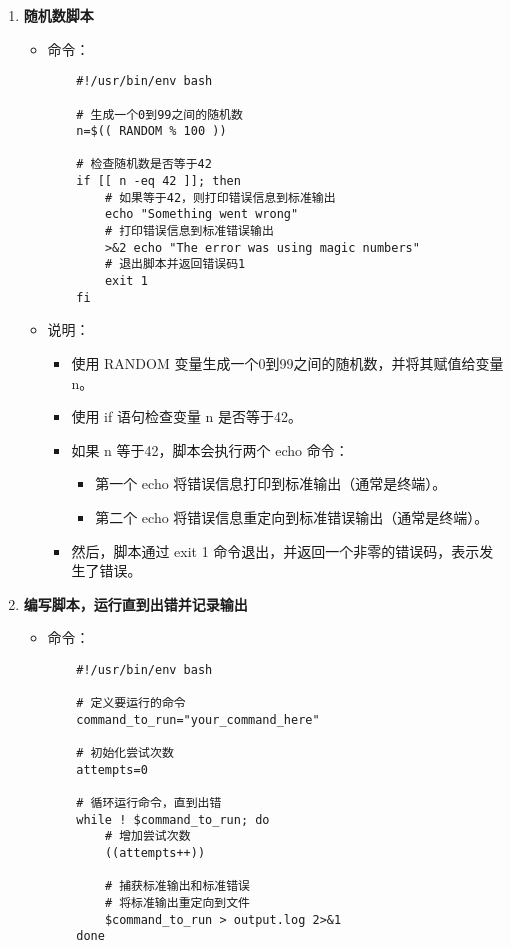 \documentclass[UTF8]{ctexart}
\begin{document}
\begin{enumerate}
\item \textbf{随机数脚本}
  \begin{itemize}
    \item 命令：
    \begin{verbatim}
    #!/usr/bin/env bash

    # 生成一个0到99之间的随机数
    n=$(( RANDOM % 100 ))

    # 检查随机数是否等于42
    if [[ n -eq 42 ]]; then
        # 如果等于42，则打印错误信息到标准输出
        echo "Something went wrong"
        # 打印错误信息到标准错误输出
        >&2 echo "The error was using magic numbers"
        # 退出脚本并返回错误码1
        exit 1
    fi
    \end{verbatim}
    \item 说明：
    \begin{itemize}
      \item 使用 RANDOM 变量生成一个0到99之间的随机数，并将其赋值给变量 n。
      \item 使用 if 语句检查变量 n 是否等于42。
      \item 如果 n 等于42，脚本会执行两个 echo 命令：
      \begin{itemize}
        \item 第一个 echo 将错误信息打印到标准输出（通常是终端）。
        \item 第二个 echo 将错误信息重定向到标准错误输出（通常是终端）。
      \end{itemize}
      \item 然后，脚本通过 exit 1 命令退出，并返回一个非零的错误码，表示发生了错误。
    \end{itemize}
  \end{itemize}

  \item \textbf{编写脚本，运行直到出错并记录输出}
  \begin{itemize}
    \item 命令：
    \begin{verbatim}
    #!/usr/bin/env bash

    # 定义要运行的命令
    command_to_run="your_command_here"

    # 初始化尝试次数
    attempts=0

    # 循环运行命令，直到出错
    while ! $command_to_run; do
        # 增加尝试次数
        ((attempts++))

        # 捕获标准输出和标准错误
        # 将标准输出重定向到文件
        $command_to_run > output.log 2>&1
    done


\end{verbatim}
\end{itemize}
\end{enumerate}
\end{document}
